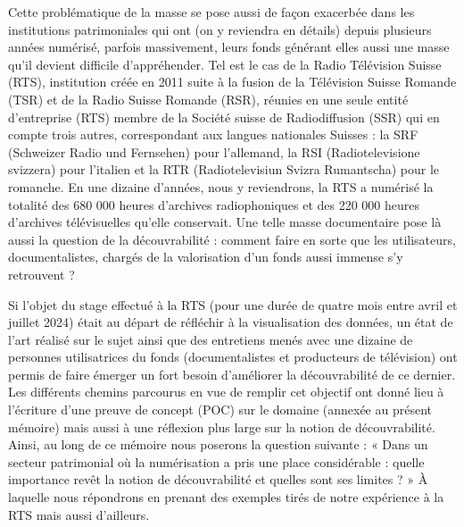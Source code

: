 \documentclass[a4paper,12pt,twoside]{book}
\begin{document}
	Cette problématique de la masse se pose aussi de façon exacerbée dans les institutions patrimoniales qui ont (on y reviendra en détails) depuis plusieurs années numérisé, parfois massivement, leurs fonds générant elles aussi une masse qu’il devient difficile d’appréhender. Tel est le cas de la Radio Télévision Suisse (RTS), institution créée en 2011 suite à la fusion de la Télévision Suisse Romande (TSR) et de la Radio Suisse Romande (RSR), réunies en une seule entité d’entreprise (RTS) membre de la Société suisse de Radiodiffusion (SSR) qui en compte trois autres, correspondant aux langues nationales Suisses : la SRF (Schweizer Radio und Fernsehen) pour l’allemand, la RSI (Radiotelevisione svizzera) pour l’italien et la RTR (Radiotelevisiun Svizra Rumantscha) pour le romanche. En une dizaine d’années, nous y reviendrons, la RTS a numérisé la totalité des 680 000 heures d’archives radiophoniques et des 220 000 heures d’archives télévisuelles qu’elle conservait. Une telle masse documentaire pose là aussi la question de la découvrabilité : comment faire en sorte que les utilisateurs, documentalistes, chargés de la valorisation d’un fonds aussi immense s’y retrouvent ?
	
	Si l’objet du stage effectué à la RTS (pour une durée de quatre mois entre avril et juillet 2024) était au départ de réfléchir à la visualisation des données, un état de l’art réalisé sur le sujet ainsi que des entretiens menés avec une dizaine de personnes utilisatrices du fonds (documentalistes et producteurs de télévision) ont permis de faire émerger un fort besoin d’améliorer la découvrabilité de ce dernier. Les différents chemins parcourus en vue de remplir cet objectif ont donné lieu à l’écriture d’une preuve de concept (POC) sur le domaine (annexée au présent mémoire) mais aussi à une réflexion plus large sur la notion de découvrabilité. Ainsi, au long de ce mémoire nous poserons la question suivante : « Dans un secteur patrimonial où la numérisation a pris une place considérable : quelle importance revêt la notion de découvrabilité et quelles sont ses limites ? » À laquelle nous répondrons en prenant des exemples tirés de notre expérience à la RTS mais aussi d’ailleurs.
	
\end{document}
